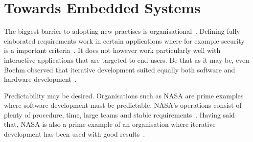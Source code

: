 \documentclass[english]{tktltiki2}
\begin{document}

\section{Towards Embedded Systems}

The biggest barrier to adopting new practises is organisational~\cite{Pop02}. Defining fully elaborated requirements work in certain applications where for example security is a important criteria~\cite{Boe88}. It does not however work particularly well with interactive applications that are targeted to end-users. Be that as it may be, even Boehm observed that iterative development suited equally both software and hardware development~\cite{Boe88}.

Predictability may be desired. Organisations such as NASA are prime examples where software development must be predictable. NASA’s operations consist of plenty of procedure, time, large teams and stable requirements~\cite{Fow05}. Having said that, NASA is also a prime example of an organisation where iterative development has been used with good results~\cite{LB03}.
\end{document}
